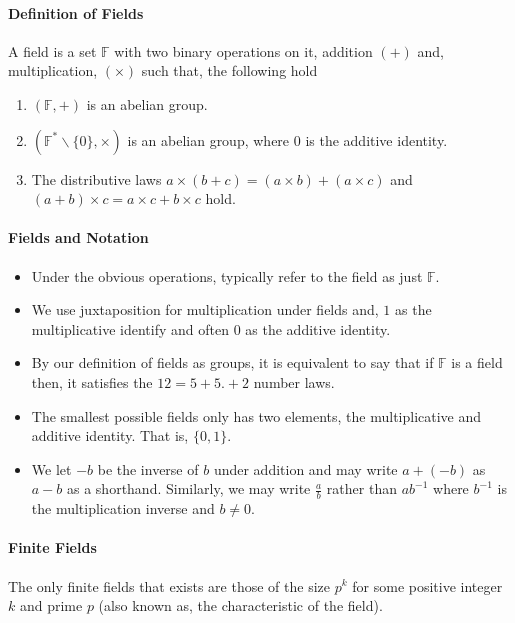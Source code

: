 \paragraph{Definition of Fields}
A field is a set \(\mathbb{F}\) with two binary operations on it,
addition \((+)\) and, multiplication, \((\times)\) such that, the following
hold
\begin{enumerate}
    \item \((\mathbb{F}, +)\) is an abelian group.
    \item \((\mathbb{F}^*\backslash \{0\}, \times)\) is an abelian group, where
    \(0\) is the additive identity.
    \item The distributive laws \(a\times (b+c) = (a\times b) + (a\times c)\)
    and \((a+b)\times c = a\times c + b\times c\) hold.
\end{enumerate}


\paragraph{Fields and Notation}
\begin{itemize}
    \item Under the obvious operations, typically refer to the field as
    just \(\mathbb{F}\).
    \item We use juxtaposition for multiplication under fields and, \(1\) as
    the multiplicative identify and often \(0\) as the additive identity.
    \item By our definition of fields as groups, it is equivalent to say
    that if \(\mathbb{F}\) is a field then, it satisfies the
    \(12 = 5 + 5 . + 2\) number laws.
    \item The smallest possible fields only has two elements, the
    multiplicative and additive identity. That is, \(\{0, 1\}\).
    \item We let \(-b\) be the inverse of \(b\) under addition and may write
    \(a + (-b)\) as \(a - b\) as a shorthand. Similarly, we may write
    \(\frac{a}{b}\) rather than \(ab^{-1}\) where \(b^{-1}\) is the
    multiplication inverse and \(b\neq 0\).
\end{itemize}

\paragraph{Finite Fields}
The only finite fields that exists are those of the size \(p^k\) for some
positive integer \(k\)  and prime \(p\) (also known as, the characteristic
of the field).

